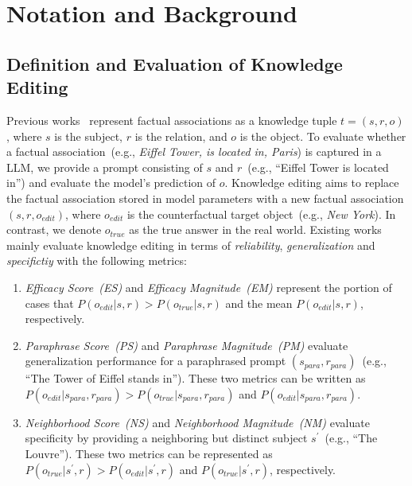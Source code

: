 \section{Notation and Background}


\subsection{Definition and Evaluation of Knowledge Editing}
\label{sec:edit_def}
Previous works~\citep{dai2021knowledge, rome, memit} represent factual associations as a knowledge tuple \(t=(s,r,o)\), where $s$ is the subject, $r$ is the relation, and $o$ is the object.
To evaluate whether a factual association~(e.g., \textit{Eiffel Tower, is located in, Paris}) is captured in a LLM, we provide a prompt consisting of \(s\) and \(r\)~(e.g., ``Eiffel Tower is located in'') and evaluate the model's prediction of $o$.
Knowledge editing aims to replace the factual association stored in model parameters with a new factual association \((s,r,o_{edit})\), where \(o_{edit}\) is the counterfactual target object~(e.g., \textit{New York}).
In contrast, we denote $o_{true}$ as the true answer in the real world.
Existing works~\citep{rome,memit, mend,malmen} mainly evaluate knowledge editing in terms of \textit{reliability}, \textit{generalization} and \textit{specifictiy} with the following metrics:

\begin{enumerate}[label=\arabic*), itemsep=2pt, wide=0pt, leftmargin=*, after=\strut]
    \item \textit{Efficacy Score~(ES)} and \textit{Efficacy Magnitude~(EM)} represent the portion of cases that \(P(o_{edit}|s,r) > P(o_{true}|s,r)\) and the mean \(P(o_{edit}|s,r)\), respectively.

    \item \textit{Paraphrase Score~(PS)} and \textit{Paraphrase Magnitude~(PM)} evaluate generalization performance for a paraphrased prompt \((s_{para}, r_{para})\)~(e.g., ``The Tower of Eiffel stands in''). 
    These two metrics can be written as \(P(o_{edit}|s_{para},r_{para}) > P(o_{true}|s_{para},r_{para})\) and \(P(o_{edit}|s_{para},r_{para})\).

    \item \textit{Neighborhood Score~(NS)} and \textit{Neighborhood Magnitude~(NM)} evaluate specificity by providing a neighboring but distinct subject \(s^\prime\)~(e.g., ``The Louvre'').
    These two metrics can be represented as \(P(o_{true}|s^\prime,r) > P(o_{edit}|s^\prime,r)\) and \(P(o_{true}|s^\prime,r)\), respectively.
\end{enumerate}

